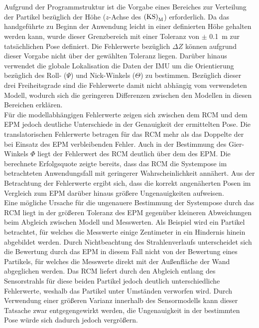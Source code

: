 Aufgrund der Programmstruktur ist die Vorgabe eines Bereiches zur Verteilung der Partikel bezüglich der Höhe ($z$-Achse des ${\mathrm{(KS)}}_{\mathrm{M}}$) erforderlich. Da das handgeführte \kps{} zu Beginn der Anwendung leicht in einer definierten Höhe gehalten werden kann, wurde dieser Grenzbereich mit einer Toleranz von $\pm$ \SI{0,1}{\meter} zur tatsächlichen Pose definiert. Die Fehlerwerte bezüglich $\Delta Z$ können aufgrund dieser Vorgabe nicht über der gewählten Toleranz liegen. Darüber hinaus verwendet die globale Lokalisation die Daten der IMU um die Orientierung bezüglich des Roll- ($\Psi$) und Nick-Winkels ($\Theta$) zu bestimmen. Bezüglich dieser drei Freiheitsgrade sind die Fehlerwerte damit nicht abhängig vom verwendeten Modell, wodurch sich die geringeren Differenzen zwischen den Modellen in diesen Bereichen erklären.\\

Für die modellabhängigen Fehlerwerte zeigen sich zwischen dem RCM und dem EPM jedoch deutliche Unterschiede in der Genauigkeit der ermittelten Pose. Die translatorischen Fehlerwerte betragen für das RCM mehr als das Doppelte der bei Einsatz des EPM verbleibenden Fehler. Auch in der Bestimmung des Gier-Winkels $\Phi$ liegt der Fehlerwert des RCM deutlich über dem des EPM. Die berechnete Erfolgsquote zeigte bereits, dass das RCM die Systempose im betrachteten Anwendungsfall mit geringerer Wahrscheinlichkeit annähert. Aus der Betrachtung der Fehlerwerte ergibt sich, dass die korrekt angenäherten Posen im Vergleich zum EPM darüber hinaus größere Ungenauigkeiten aufweisen.\\

Eine mögliche Ursache für die ungenauere Bestimmung der Systempose durch das RCM liegt in der größeren Toleranz des EPM gegenüber kleineren Abweichungen beim Abgleich zwischen Modell und Messwerten. Als Beispiel wird ein Partikel betrachtet, für welches die Messwerte einige Zentimeter in ein Hindernis hinein abgebildet werden. Durch Nichtbeachtung des Strahlenverlaufs unterscheidet sich die Bewertung durch das EPM in diesem Fall nicht von der Bewertung eines Partikels, für welches die Messwerte direkt mit der Außenfläche der Wand abgeglichen werden. Das RCM liefert durch den Abgleich entlang des Sensorstrahls für diese beiden Partikel jedoch deutlich unterschiedliche Fehlerwerte, weshalb das Partikel unter Umständen verworfen wird. Durch Verwendung einer größeren Varianz innerhalb des Sensormodells kann dieser Tatsache zwar entgegengewirkt werden, die Ungenauigkeit in der bestimmten Pose würde sich dadurch jedoch vergrößern.\\

